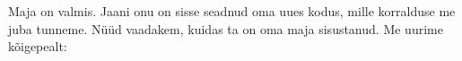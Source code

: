 %
%
%
%
%
%

\VUsaut{6.0mm}
\VUsaut{1.4mm}
\VUsaut{0.4mm}
\VUsaut{2.2mm}

Maja on valmis. Jaani onu on sisse seadnud oma uues kodus, mille korralduse me juba
tunneme. Nüüd vaadakem, kuidas ta on oma maja sisustanud. Me uurime kõigepealt:

